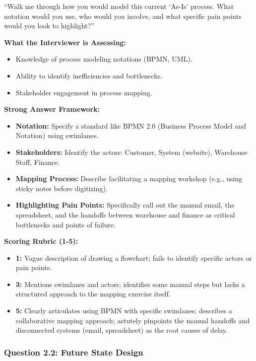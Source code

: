 \documentclass[
  11pt,
  openany,
  oneside]{book}
\providecommand{\tightlist}{%
  \setlength{\itemsep}{0pt}\setlength{\parskip}{0pt}}
\begin{document}
``Walk me through how you would model this current `As-Is' process. What
notation would you use, who would you involve, and what specific pain
points would you look to highlight?''

\textbf{What the Interviewer is Assessing:}

\begin{itemize}
\tightlist
\item
  Knowledge of process modeling notations (BPMN, UML).
\item
  Ability to identify inefficiencies and bottlenecks.
\item
  Stakeholder engagement in process mapping.
\end{itemize}

\textbf{Strong Answer Framework:}

\begin{itemize}
\tightlist
\item
  \textbf{Notation:} Specify a standard like BPMN 2.0 (Business Process
  Model and Notation) using swimlanes.
\item
  \textbf{Stakeholders:} Identify the actors: Customer, System
  (website), Warehouse Staff, Finance.
\item
  \textbf{Mapping Process:} Describe facilitating a mapping workshop
  (e.g., using sticky notes before digitizing).
\item
  \textbf{Highlighting Pain Points:} Specifically call out the manual
  email, the spreadsheet, and the handoffs between warehouse and finance
  as critical bottlenecks and points of failure.
\end{itemize}

\textbf{Scoring Rubric (1-5):}

\begin{itemize}
\tightlist
\item
  \textbf{1:} Vague description of drawing a flowchart; fails to
  identify specific actors or pain points.
\item
  \textbf{3:} Mentions swimlanes and actors; identifies some manual
  steps but lacks a structured approach to the mapping exercise itself.
\item
  \textbf{5:} Clearly articulates using BPMN with specific swimlanes;
  describes a collaborative mapping approach; astutely pinpoints the
  manual handoffs and disconnected systems (email, spreadsheet) as the
  root causes of delay.
\end{itemize}

\subsubsection{Question 2.2: Future State
Design}\label{question-2.2-future-state-design}
\end{document}
